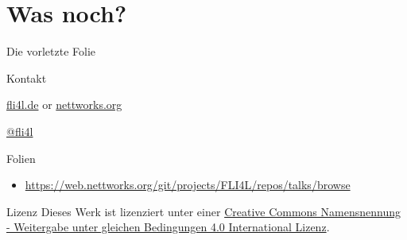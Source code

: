 \documentclass[t]{beamer}
\begin{document}
\section*{Was noch?}

\begin{frame}{Die vorletzte Folie}
    \begin{block}{Kontakt}
        \begin{description}[Twitter]
            \item [WWW] \href{https://www.fli4l.de/}{fli4l.de} or
                    \href{https://www.nettworks.org/}{nettworks.org}
            \item [Twitter] \href{https://twitter.com/fli4l}{@fli4l}
        \end{description}
    \end{block}
    \begin{block}{Folien}
        \begin{itemize}
            \item \url{https://web.nettworks.org/git/projects/FLI4L/repos/talks/browse}
        \end{itemize}
    \end{block}
    \begin{block}{Lizenz}
        Dieses Werk ist lizenziert unter einer
        \href{http://creativecommons.org/licenses/by-sa/4.0/}{Creative Commons
        Namensnennung - Weitergabe unter gleichen Bedingungen 4.0 International
        Lizenz}.
    \end{block}
\end{frame}

\end{document}
